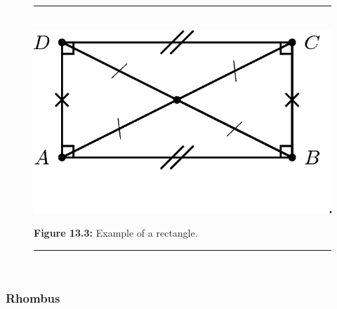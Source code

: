           
    \setcounter{subfigure}{0}


	\begin{figure}[H] %
    \begin{center}
    \rule[.1in]{\figurerulewidth}{.005in} \\
        \label{m39354*uid68!!!underscore!!!media}\label{m39354*uid68!!!underscore!!!printimage}\includegraphics{col11306.imgs/m39354_MG10C13_042.png} %
        
      \vspace{2pt}
    \vspace{\rubberspace}\par \begin{cnxcaption}
	  \small \textbf{Figure 13.3: }Example of a rectangle.
	\end{cnxcaption}
      
    \vspace{.1in}
    \rule[.1in]{\figurerulewidth}{.005in} \\
        
    \end{center}

 \end{figure}   

    \addtocounter{footnote}{-0}
    
        
        \label{m39354*uid69}
            \subsubsection{ Rhombus}
            \nopagebreak
            
